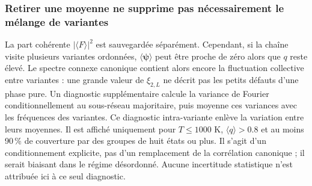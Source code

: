 \subsubsection{Retirer une moyenne ne supprime pas nécessairement le mélange de variantes}
La part cohérente $|\langle F\rangle|^2$ est sauvegardée séparément. Cependant, si la chaîne visite plusieurs variantes ordonnées, $\langle\boldsymbol\psi\rangle$ peut être proche de zéro alors que $q$ reste élevé. Le spectre connexe canonique contient alors encore la fluctuation collective entre variantes : une grande valeur de $\xi_{2,L}$ ne décrit pas les petits défauts d'une phase pure.
Un diagnostic supplémentaire calcule la variance de Fourier conditionnellement au sous-réseau majoritaire, puis moyenne ces variances avec les fréquences des variantes. Ce diagnostic intra-variante enlève la variation entre leurs moyennes. Il est affiché uniquement pour $T\leq1000$ K, $\langle q\rangle>0.8$ et au moins 90\,\% de couverture par des groupes de huit états ou plus. Il s'agit d'un conditionnement explicite, pas d'un remplacement de la corrélation canonique ; il serait biaisant dans le régime désordonné. Aucune incertitude statistique n'est attribuée ici à ce seul diagnostic.
